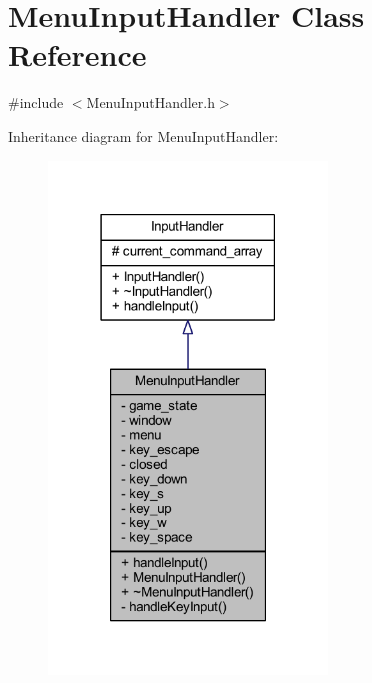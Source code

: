\hypertarget{class_menu_input_handler}{}\section{Menu\+Input\+Handler Class Reference}
\label{class_menu_input_handler}


{\ttfamily \#include $<$Menu\+Input\+Handler.\+h$>$}



Inheritance diagram for Menu\+Input\+Handler\+:\nopagebreak
\begin{figure}[H]
\begin{center}
\leavevmode
\includegraphics[width=210pt]{class_menu_input_handler__inherit__graph}
\end{center}
\end{figure}


